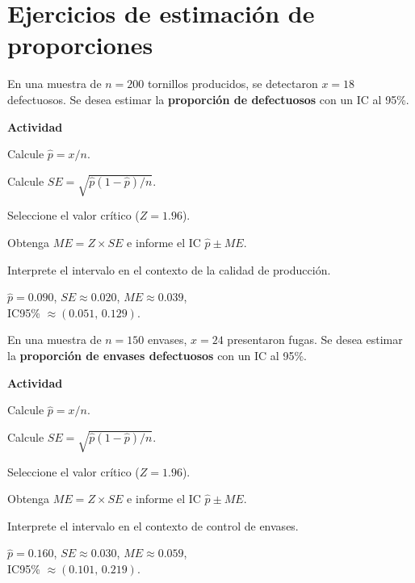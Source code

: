 
\section{Ejercicios de estimación de proporciones}

\begin{ejercicio}[Defectuosos en producción (n=200)]
En una muestra de $n=200$ tornillos producidos, se detectaron $x=18$ defectuosos.
Se desea estimar la \textbf{proporción de defectuosos} con un IC al 95\%.


\textbf{Actividad}
\begin{pasos}
  \item Calcule $\hat{p} = x/n$.
  \item Calcule $SE = \sqrt{\hat{p}(1-\hat{p})/n}$.
  \item Seleccione el valor crítico ($Z=1.96$).
  \item Obtenga $ME=Z \times SE$ e informe el IC $\hat{p}\pm ME$.
  \item Interprete el intervalo en el contexto de la calidad de producción.
\end{pasos}

\begin{clave}
$\hat{p}=0.090$, \quad $SE\approx0.020$, \quad $ME\approx0.039$,\\
IC95\% $\approx (0.051,\,0.129)$.
\end{clave}
\end{ejercicio}


\begin{ejercicio}[Envases con fuga (n=150)]
En una muestra de $n=150$ envases, $x=24$ presentaron fugas.
Se desea estimar la \textbf{proporción de envases defectuosos} con un IC al 95\%.


\textbf{Actividad}
\begin{pasos}
  \item Calcule $\hat{p} = x/n$.
  \item Calcule $SE = \sqrt{\hat{p}(1-\hat{p})/n}$.
  \item Seleccione el valor crítico ($Z=1.96$).
  \item Obtenga $ME=Z \times SE$ e informe el IC $\hat{p}\pm ME$.
  \item Interprete el intervalo en el contexto de control de envases.
\end{pasos}

\begin{clave}
$\hat{p}=0.160$, \quad $SE\approx0.030$, \quad $ME\approx0.059$,\\
IC95\% $\approx (0.101,\,0.219)$.
\end{clave}
\end{ejercicio}


